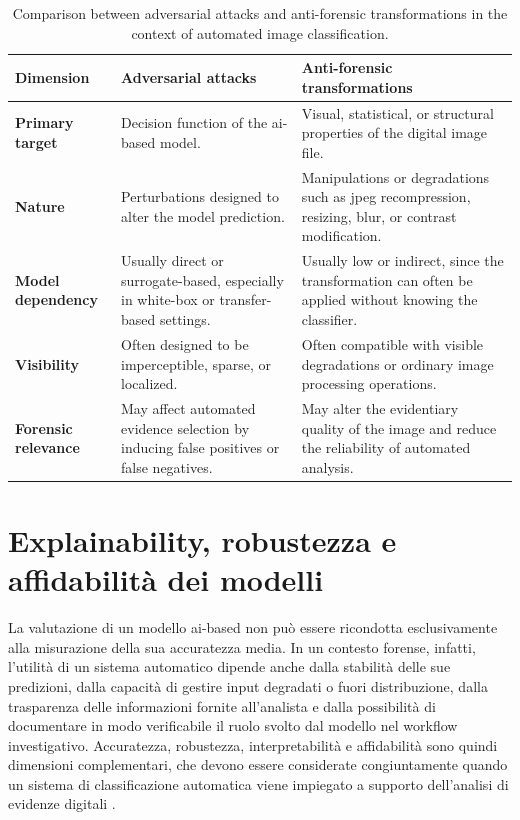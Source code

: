 \begin{table}[htbp]
    \centering
    \small
    \renewcommand{\arraystretch}{1.25}
    \begin{tabular}{@{}p{}p{}p{}@{}}
        \toprule
        \textbf{Dimension} & \textbf{Adversarial attacks} & \textbf{Anti-forensic transformations} \\
        \midrule
        \textbf{Primary target} &
        Decision function of the \gls{ai}-based model. &
        Visual, statistical, or structural properties of the digital image file. \\
        \textbf{Nature} &
        Perturbations designed to alter the model prediction. &
        Manipulations or degradations such as \gls{jpeg} recompression, resizing, blur, or contrast modification. \\
        \textbf{Model dependency} &
        Usually direct or surrogate-based, especially in white-box or transfer-based settings. &
        Usually low or indirect, since the transformation can often be applied without knowing the classifier. \\
        \textbf{Visibility} &
        Often designed to be imperceptible, sparse, or localized. &
        Often compatible with visible degradations or ordinary image processing operations. \\
        \textbf{Forensic relevance} &
        May affect automated evidence selection by inducing false positives or false negatives. &
        May alter the evidentiary quality of the image and reduce the reliability of automated analysis. \\
        \bottomrule
    \end{tabular}
    \caption{Comparison between adversarial attacks and anti-forensic transformations in the context of automated image classification.}
    \label{tab:adv_vs_antiforensics}
\end{table}


\section{Explainability, robustezza e affidabilità dei modelli}
\label{sec:background_xai_robustness}

La valutazione di un modello \gls{ai}-based non può essere ricondotta
esclusivamente alla misurazione della sua accuratezza media. In un contesto
forense, infatti, l'utilità di un sistema automatico dipende anche dalla
stabilità delle sue predizioni, dalla capacità di gestire input degradati o
fuori distribuzione, dalla trasparenza delle informazioni fornite all'analista e
dalla possibilità di documentare in modo verificabile il ruolo svolto dal
modello nel workflow investigativo. Accuratezza, robustezza, interpretabilità e
affidabilità sono quindi dimensioni complementari, che devono essere considerate
congiuntamente quando un sistema di classificazione automatica viene impiegato a
supporto dell'analisi di evidenze digitali
\cite{Adadi2018,Doshi-Velez2017}.

